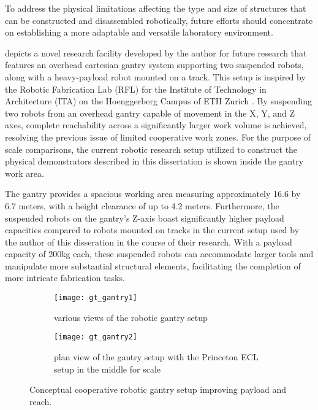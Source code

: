        To address the physical limitations affecting the type and size of structures that can be constructed and disassembled robotically, future efforts should concentrate on establishing a more adaptable and versatile laboratory environment. 

         depicts a novel research facility developed by the author for future research that features an overhead cartesian gantry system supporting two suspended robots, along with a heavy-payload robot mounted on a track. This setup is inspired by the Robotic Fabrication Lab (RFL) for the Institute of Technology in Architecture (ITA) on the Hoenggerberg Campus of ETH Zurich \cite{chair_of_architecture_and_digital_fabrication_robotic_2016}. By suspending two robots from an overhead gantry capable of movement in the X, Y, and Z axes, complete reachability across a significantly larger work volume is achieved, resolving the previous issue of limited cooperative work zones. For the purpose of scale comparisons, the current robotic research setup utilized to construct the physical demonstrators described in this dissertation is shown inside the gantry work area. 

        The gantry provides a spacious working area measuring approximately 16.6 by 6.7 meters, with a height clearance of up to 4.2 meters. Furthermore, the suspended robots on the gantry's Z-axis boast significantly higher payload capacities compared to robots mounted on tracks in the current setup used by the author of this disseration in the course of their research. With a payload capacity of 200kg each, these suspended robots can accommodate larger tools and manipulate more substantial structural elements, facilitating the completion of more intricate fabrication tasks.

        \begin{figure}[H]
            \centering
            \begin{subfigure}{.99\textwidth}
                \centering
                \texttt{[image: gt\_gantry1]}
                \caption{various views of the robotic gantry setup}
            \end{subfigure}
            
            \begin{subfigure}{.99\textwidth}
                \centering
                \texttt{[image: gt\_gantry2]}
                \caption{plan view of the gantry setup with the Princeton ECL setup in the middle for scale}
            \end{subfigure}
            \caption{Conceptual cooperative robotic gantry setup improving payload and reach.}
            \label{fig:gt_setup}
        \end{figure}   

